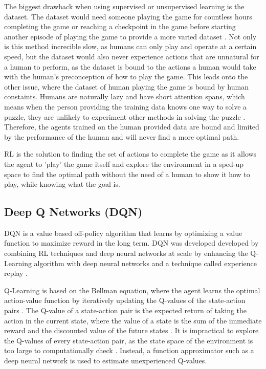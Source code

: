 The biggest drawback when using supervised or unsupervised learning is the dataset. The dataset would need someone playing the game for countless hours completing the game or reaching a checkpoint in the game before starting another episode of playing the game to provide a more varied dataset \cite{XanderSteenbrugge2019intro}. Not only is this method increcible slow, as humans can only play and operate at a certain speed, but the dataset would also never experience actions that are unnatural for a human to perform, as the dataset is bound to the actions a human would take with the human's preconception of how to play the game. This leads onto the other issue, where the dataset of human playing the game is bound by human constaints. Humans are naturally lazy and have short attention spans, which means when the person providing the training data knows one way to solve a puzzle, they are unlikely to experiment other methods in solving the puzzle \cite{XanderSteenbrugge2019intro}. Therefore, the agents trained on the human provided data are bound and limited by the performance of the human and will never find a more optimal path. 

RL is the solution to finding the set of actions to complete the game as it allows the agent to 'play' the game itself and explore the environment in a sped-up space to find the optimal path without the need of a human to show it how to play, while knowing what the goal is. 

\subsection{Deep Q Networks (DQN)}

DQN is a value based off-policy algorithm that learns by optimizing a value function to maximize reward in the long term. DQN was developed developed by combining RL techniques and deep neural networks at scale by enhancing the Q-Learning algorithm with deep neural networks and a technique called experience replay \cite{TFAgentsAuthors2023}.

Q-Learning is based on the Bellman equation, where the agent learns the optimal action-value function by iteratively updating the Q-values of the state-action pairs \cite{mnih2013playing}. The Q-value of a state-action pair is the expected return of taking the action in the current state, where the value of a state is the sum of the immediate reward and the discounted value of the future states \cite{bellman1958dynamic}. It is impractical to explore the Q-values of every state-action pair, as the state space of the environment is too large to computationally check \cite{mnih2013playing}. Instead, a function approximator such as a deep neural network is used to estimate unexperienced Q-values. 

